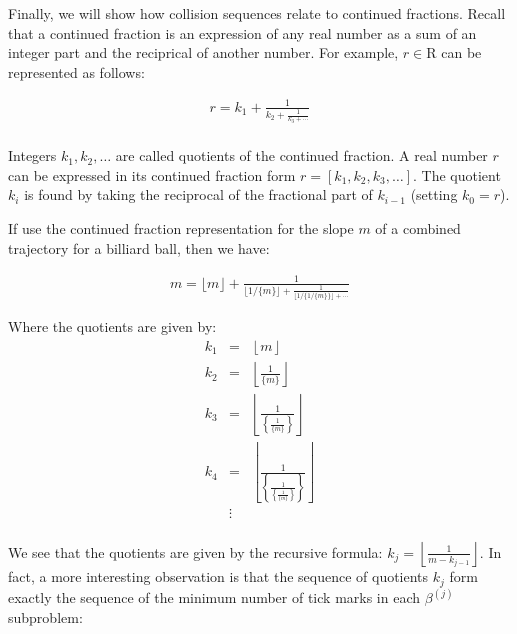 Finally, we will show how collision sequences relate to continued fractions. Recall that a continued fraction is an expression of any real number as a sum of an integer part and the reciprical of another number. For example, $r \in \mathrm{R}$ can be represented as follows:

\begin{eqnarray}
r = k_1 + \frac{1}{k_2 + \frac{1}{k_3 + \cdots}} \\
\end{eqnarray}

Integers $k_1, k_2, \ldots$ are called quotients of the continued fraction. A real number $r$ can be expressed in its continued fraction form $r = [k_1, k_2, k_3, \ldots]$. The quotient $k_i$ is found by taking the reciprocal of the fractional part of $k_{i-1}$ (setting $k_0 = r$).

If use the continued fraction representation for the slope $m$ of a combined trajectory for a billiard ball, then we have:

\begin{eqnarray}
m = \lfloor m \rfloor + \frac{1}{\lfloor 1 / \{m\} \rfloor + \frac{1}{\lfloor 1/\{1/\{m\}\} \rfloor + \cdots}}
\end{eqnarray}

Where the quotients are given by:
\begin{eqnarray}
  k_1 &=& \left\lfloor m \right\rfloor \\
  k_2 &=& \left\lfloor \frac{1}{\{m\}} \right\rfloor \\
  k_3 &=& \left\lfloor \frac{1}{\left\{ \frac{1}{\{m\}} \right\}} \right\rfloor \\
  k_4 &=& \left\lfloor \frac{1}{\left\{ \frac{1}{\left\{\frac{1}{\{m\}}\right\}} \right\}} \right\rfloor \\
      &\vdots& \\
\end{eqnarray}

We see that the quotients are given by the recursive formula: $k_j = \left\lfloor \frac{1}{m - k_{j-1}} \right\rfloor$. In fact, a more interesting observation is that the sequence of quotients $k_j$ form exactly the sequence of the minimum number of tick marks in each $\beta^{(j)}$ subproblem:

